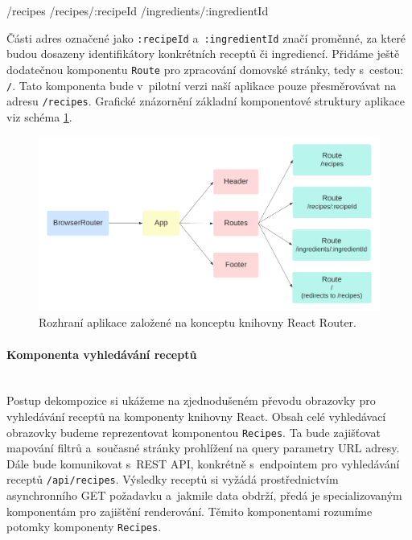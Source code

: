 \begin{code}
/recipes
/recipes/:recipeId
/ingredients/:ingredientId
\end{code}

Části adres označené jako \texttt{:recipeId} a~\texttt{:ingredientId} značí proměnné, za které budou dosazeny identifikátory konkrétních receptů či ingrediencí. Přidáme ještě dodatečnou komponentu \texttt{Route} pro zpracování domovské stránky, tedy s~cestou: \texttt{/}. Tato komponenta bude v~pilotní verzi naší aplikace pouze přesměrovávat na adresu \texttt{/recipes}. Grafické znázornění základní komponentové struktury aplikace viz schéma \ref{obr02:react-app}.

\begin{figure}[h!]\centering
\includegraphics[width=140mm]{../img/react-app}
\caption{Rozhraní aplikace založené na konceptu knihovny React Router.}
\label{obr02:react-app}
\end{figure}

\paragraph{Komponenta vyhledávání receptů}\mbox{}\\

Postup dekompozice si ukážeme na zjednodušeném převodu obrazovky pro vyhledávání receptů na komponenty knihovny React. Obsah celé vyhledávací obrazovky budeme reprezentovat komponentou \texttt{Recipes}. Ta bude zajišťovat mapování filtrů a~současné stránky prohlížení na query parametry URL adresy. Dále bude komunikovat s~REST API, konkrétně s~endpointem pro vyhledávání receptů \texttt{/api/recipes}. Výsledky receptů si vyžádá prostřednictvím asynchronního GET požadavku a~jakmile data obdrží, předá je specializovaným komponentám pro zajištění renderování. Těmito komponentami rozumíme potomky komponenty \texttt{Recipes}.

